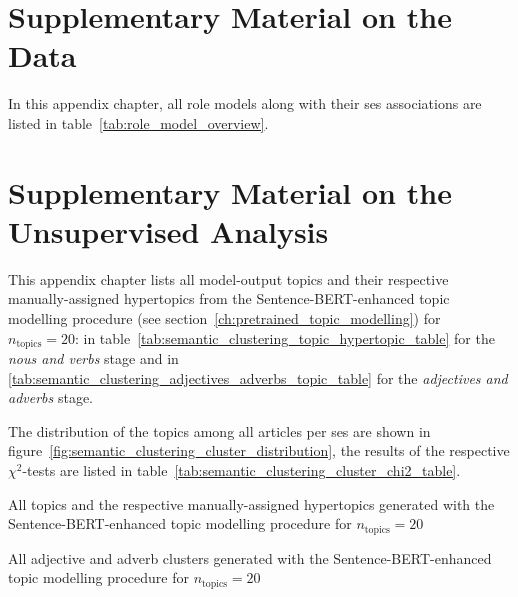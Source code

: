 \renewcommand{\imagepath}{../90-appendix/img}

\appendix

\chapter{Supplementary Material on the Data}\label{ch:data_appendix}
In this appendix chapter, all role models along with their \gls{ses} associations are listed in table~\ref{tab:role_model_overview}.




\chapter{Supplementary Material on the Unsupervised Analysis}\label{ch:unsupervised_appendix}
This appendix chapter lists all model-output topics and their respective manually-assigned hypertopics from the Sentence-BERT-enhanced topic modelling procedure (see section~\ref{ch:pretrained_topic_modelling}) for $n_\text{topics} = 20$: in table~\ref{tab:semantic_clustering_topic_hypertopic_table} for the \textit{nous and verbs} stage and in \ref{tab:semantic_clustering_adjectives_adverbs_topic_table} for the \textit{adjectives and adverbs} stage.

The distribution of the topics among all articles per \gls{ses} are shown in figure~\ref{fig:semantic_clustering_cluster_distribution}, the results of the respective $\chi^2$-tests are listed in table~\ref{tab:semantic_clustering_cluster_chi2_table}.
\begin{table}[h]
    \centering
    
    \caption{All topics and the respective manually-assigned hypertopics generated with the Sentence-BERT-enhanced topic modelling procedure for $n_\text{topics}=20$}\label{tab:semantic_clustering_topic_hypertopic_table}
\end{table}

\begin{table}
    \centering
    
    \caption{All adjective and adverb clusters generated with the Sentence-BERT-enhanced topic modelling procedure for $n_\text{topics}=20$}\label{tab:semantic_clustering_adjectives_adverbs_topic_table}
\end{table}

